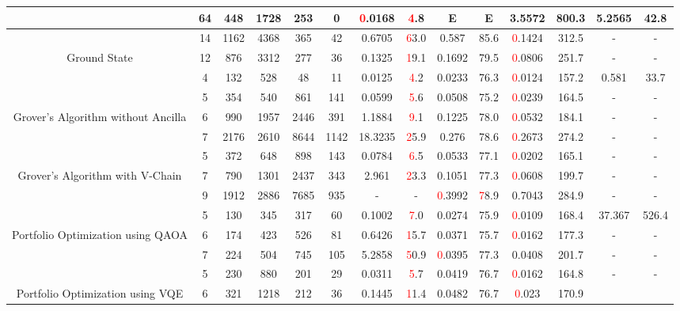 \begin{table}[htb]
{\begin{tabular}{|c|c|c|c|c|c|c|c|c|c|c|c|c|c|}
 & 
64 & 448 & 1728 & 253 & 0
 & \textcolor{red}0.0168 & \textcolor{red}4.8
 & E & E
 & 3.5572 & 800.3
 & 5.2565 & 42.8
 \\
\hline
 & 
14 & 1162 & 4368 & 365 & 42
 & 0.6705 & \textcolor{red}63.0
 & 0.587 & 85.6
 & \textcolor{red}0.1424 & 312.5
 & - & -
 \\
Ground State & 
12 & 876 & 3312 & 277 & 36
 & 0.1325 & \textcolor{red}19.1
 & 0.1692 & 79.5
 & \textcolor{red}0.0806 & 251.7
 & - & -
 \\
 & 
4 & 132 & 528 & 48 & 11
 & 0.0125 & \textcolor{red}4.2
 & 0.0233 & 76.3
 & \textcolor{red}0.0124 & 157.2
 & 0.581 & 33.7
 \\
\hline
 & 
5 & 354 & 540 & 861 & 141
 & 0.0599 & \textcolor{red}5.6
 & 0.0508 & 75.2
 & \textcolor{red}0.0239 & 164.5
 & - & -
 \\
Grover's Algorithm without Ancilla & 
6 & 990 & 1957 & 2446 & 391
 & 1.1884 & \textcolor{red}9.1
 & 0.1225 & 78.0
 & \textcolor{red}0.0532 & 184.1
 & - & -
 \\
 & 
7 & 2176 & 2610 & 8644 & 1142
 & 18.3235 & \textcolor{red}25.9
 & 0.276 & 78.6
 & \textcolor{red}0.2673 & 274.2
 & - & -
 \\
\hline
 & 
5 & 372 & 648 & 898 & 143
 & 0.0784 & \textcolor{red}6.5
 & 0.0533 & 77.1
 & \textcolor{red}0.0202 & 165.1
 & - & -
 \\
Grover's Algorithm with V-Chain & 
7 & 790 & 1301 & 2437 & 343
 & 2.961 & \textcolor{red}23.3
 & 0.1051 & 77.3
 & \textcolor{red}0.0608 & 199.7
 & - & -
 \\
 & 
9 & 1912 & 2886 & 7685 & 935
 & - & -
 & \textcolor{red}0.3992 & \textcolor{red}78.9
 & 0.7043 & 284.9
 & - & -
 \\
\hline
 & 
5 & 130 & 345 & 317 & 60
 & 0.1002 & \textcolor{red}7.0
 & 0.0274 & 75.9
 & \textcolor{red}0.0109 & 168.4
 & 37.367 & 526.4
 \\
Portfolio Optimization using QAOA & 
6 & 174 & 423 & 526 & 81
 & 0.6426 & \textcolor{red}15.7
 & 0.0371 & 75.7
 & \textcolor{red}0.0162 & 177.3
 & - & -
 \\
 & 
7 & 224 & 504 & 745 & 105
 & 5.2858 & \textcolor{red}50.9
 & \textcolor{red}0.0395 & 77.3
 & 0.0408 & 201.7
 & - & -
 \\
\hline
 & 
5 & 230 & 880 & 201 & 29
 & 0.0311 & \textcolor{red}5.7
 & 0.0419 & 76.7
 & \textcolor{red}0.0162 & 164.8
 & - & -
 \\
Portfolio Optimization using VQE & 
6 & 321 & 1218 & 212 & 36
 & 0.1445 & \textcolor{red}11.4
 & 0.0482 & 76.7
 & \textcolor{red}0.023 & 170.9

\end{tabular}}
\end{table}
